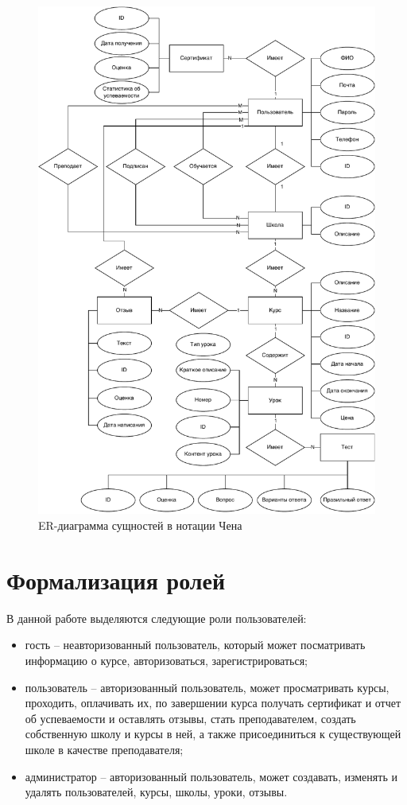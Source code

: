 \begin{figure}[H]
	\centering
	\includegraphics[height=0.9\textheight]{inc/img/er.pdf}
	\caption{ER-диаграмма сущностей в нотации Чена}
	\label{img:er}
\end{figure}

\section{Формализация ролей}
В данной работе выделяются следующие роли пользователей:
\begin{itemize}
    \item гость -- неавторизованный пользователь, который может посматривать информацию о курсе,
    авторизоваться, зарегистрироваться;
    \item пользователь -- авторизованный пользователь, может просматривать курсы, проходить, оплачивать их,
    по завершении курса получать сертификат и отчет об успеваемости и оставлять отзывы,
    стать преподавателем, создать собственную школу и курсы в ней,
    а также присоединиться к существующей школе в качестве преподавателя;
    \item администратор -- авторизованный пользователь, может создавать, изменять и удалять пользователей, курсы, школы, уроки, отзывы.
\end{itemize}

